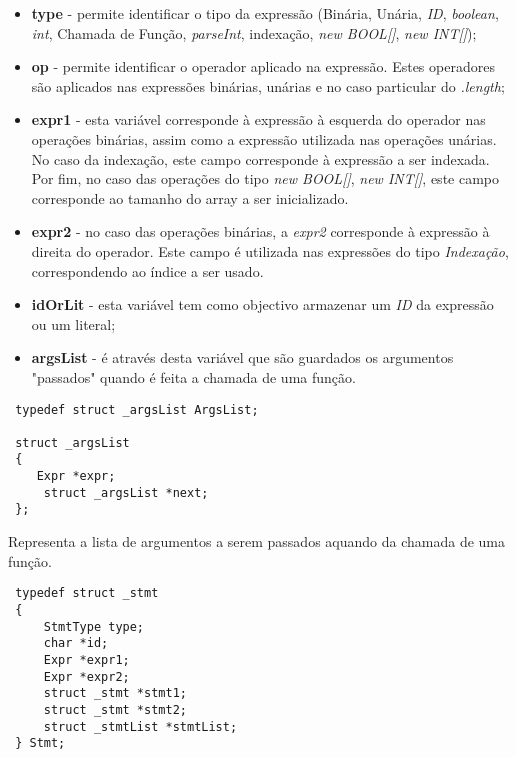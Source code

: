 \documentclass[11pt,a4paper]{article}
\begin{document}
\begin{itemize}
	\item \textbf{type} - permite identificar o tipo da expressão (Binária, Unária, \textit{ID}, \textit{boolean}, \textit{int}, Chamada de Função, \textit{parseInt}, indexação, \textit{new BOOL[]}, \textit{new INT[]});
	
	\item \textbf{op} - permite identificar o operador aplicado na expressão. Estes operadores são aplicados nas expressões binárias, unárias e no caso particular do \textit{.length};
	
	\item \textbf{expr1} - esta variável corresponde à expressão à esquerda do operador nas operações binárias, assim como a expressão utilizada nas operações unárias. No caso da indexação, este campo corresponde à expressão a ser indexada. Por fim, no caso das operações do tipo \textit{new BOOL[]}, \textit{new INT[]}, este campo corresponde ao tamanho do array a ser inicializado.
	
	\item \textbf{expr2} - no caso das operações binárias, a \textit{expr2} corresponde à expressão à direita do operador. Este campo é utilizada nas expressões do tipo \textit{Indexação}, correspondendo ao índice a ser usado.
	
	\item \textbf{idOrLit} - esta variável tem como objectivo armazenar um \textit{ID} da expressão ou um literal;
	
	\item \textbf{argsList} - é através desta variável que são guardados os argumentos "passados" quando é feita a chamada de uma função.
\end{itemize}

\newpage

\begin{lstlisting}
 typedef struct _argsList ArgsList;

 struct _argsList
 {
 	Expr *expr;
     struct _argsList *next;
 };
\end{lstlisting}

\vspace{0.3cm}

Representa a lista de argumentos a serem passados aquando da chamada de uma função.

\begin{lstlisting}
 typedef struct _stmt
 {
     StmtType type;
     char *id;
     Expr *expr1;
     Expr *expr2;
     struct _stmt *stmt1;
     struct _stmt *stmt2;
     struct _stmtList *stmtList;
 } Stmt;
\end{lstlisting}
\end{document}
